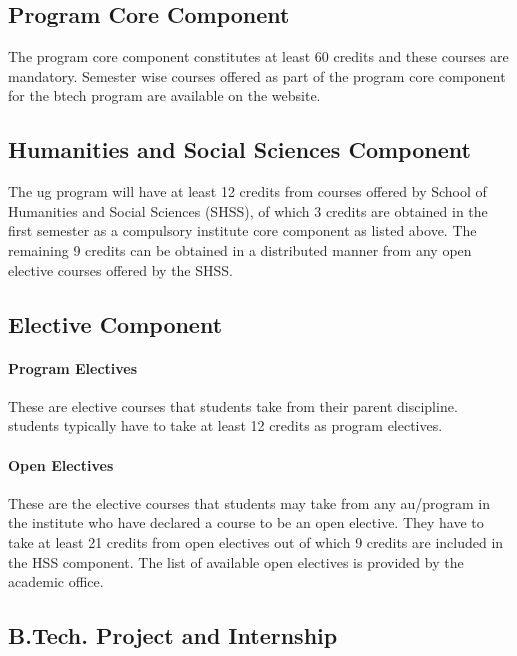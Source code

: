 \subsection{Program Core Component}

The program core component constitutes at least 60 credits and these courses are mandatory. Semester wise courses offered as part of the program core component for the \acrshort{btech} program are available on the website.

\subsection{Humanities and Social Sciences Component}

The \acrshort{ug} program will have at least 12 credits from courses offered by School of Humanities and Social Sciences (SHSS), of which 3 credits are obtained in the first semester as a compulsory institute core component as listed above. The remaining 9 credits can be obtained in a distributed manner from any open elective courses offered by the SHSS. 

\subsection{Elective Component}

\paragraph{Program Electives} These are elective courses that \glspl{student} take from their parent discipline. \Glspl{student} typically have to take at least 12 credits as program electives.

\paragraph{Open Electives} These are the elective courses that \glspl{student} may take from any \acrshort{au}/\gls{program} in the \gls{institute} who have declared a course to be an open elective. They have to take at least 21 credits from open electives out of which 9 credits are included in the HSS component. The list of available open electives is provided by the academic office.

\subsection{B.Tech. Project and Internship \label{lab:BTPandInternship}}


